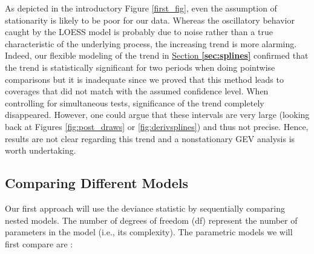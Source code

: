 As depicted in the introductory Figure \ref{first_fig}, even the assumption of stationarity is likely to be poor for our data. 
Whereas the oscillatory behavior caught by the LOESS model is probably due to noise rather than a true characteristic of the underlying process, the increasing trend is more alarming. Indeed, our flexible modeling of the trend in \hyperref[sec:splines]{Section \textbf{\ref{sec:splines}}} confirmed that the trend is statistically significant for two periods when doing pointwise comparisons but it is inadequate since we proved that this method leads to coverages that did not match with the assumed confidence level. When controlling for simultaneous tests, significance of the trend completely disappeared. However, one could argue that these intervals are very large (looking back at Figures \ref{fig:post_draws} or \ref{fig:derivsplines}) and thus not precise. Hence, results are not clear regarding this trend and a nonstationary GEV analysis is worth undertaking. 




\subsection{Comparing Different Models}\label{sec:comp0}


Our first approach will use the deviance statistic by sequentially comparing nested models. The number of degrees of freedom (df) represent the number of parameters in the model (i.e., its complexity). The parametric models we will first compare are :

